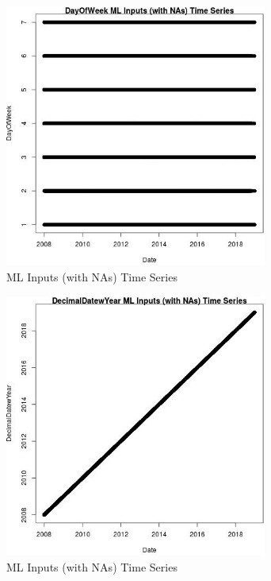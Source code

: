 \begin{figure} 
\centering  
\includegraphics[width=0.77\textwidth]{Code_Outputs/Report_ML_input_PM25_Step4_part_e_de_duplicated_aveswNAs_DayOfWeekvDate.jpg} 
\caption{\label{fig:Report_ML_input_PM25_Step4_part_e_de_duplicated_aveswNAsDayOfWeekvDate}ML Inputs (with NAs) Time Series} 
\end{figure} 
 

\begin{figure} 
\centering  
\includegraphics[width=0.77\textwidth]{Code_Outputs/Report_ML_input_PM25_Step4_part_e_de_duplicated_aveswNAs_DecimalDatewYearvDate.jpg} 
\caption{\label{fig:Report_ML_input_PM25_Step4_part_e_de_duplicated_aveswNAsDecimalDatewYearvDate}ML Inputs (with NAs) Time Series} 
\end{figure} 
 


